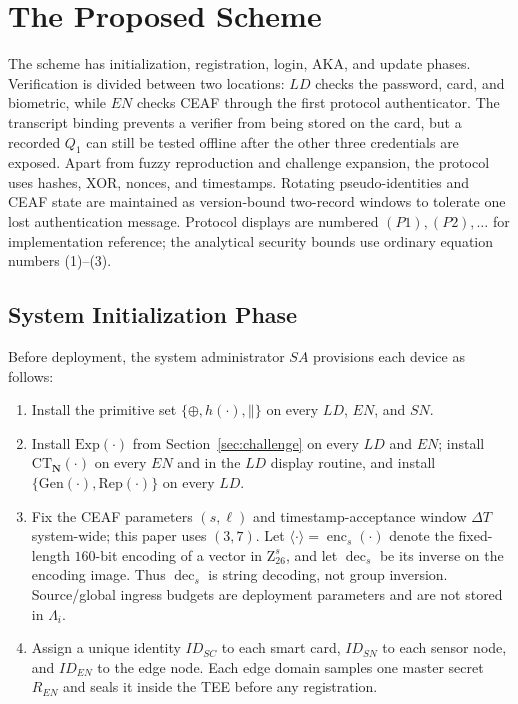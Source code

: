 \documentclass[cmc,article,submit,moreauthors,pdftex]{Definitions/tsp}
\renewcommand{\mathsf}[1]{\mathrm{#1}}
\renewcommand{\mathbb}[1]{\mathrm{#1}}
\newcommand{\cc}{\mathbin{\|}}
\newcommand{\CT}{\mathsf{CT}}
\newcommand{\Gen}{\mathrm{Gen}}
\newcommand{\Rep}{\mathrm{Rep}}
\begin{document}
\section{The Proposed Scheme}\label{sec:scheme}

The scheme has initialization, registration, login, AKA, and update phases. Verification is divided between two locations: $LD$ checks the password, card, and biometric, while $EN$ checks CEAF through the first protocol authenticator. The transcript binding prevents a verifier from being stored on the card, but a recorded $Q_1$ can still be tested offline after the other three credentials are exposed. Apart from fuzzy reproduction and challenge expansion, the protocol uses hashes, XOR, nonces, and timestamps. Rotating pseudo-identities and CEAF state are maintained as version-bound two-record windows to tolerate one lost authentication message. Protocol displays are numbered $(P1),(P2),\ldots$ for implementation reference; the analytical security bounds use ordinary equation numbers (1)--(3).

\subsection{System Initialization Phase}

Before deployment, the system administrator $SA$ provisions each device as follows:

\begin{enumerate}
\item Install the primitive set $\{\oplus, h(\cdot), \cc\}$ on every $LD$, $EN$, and $SN$.
\item Install $\mathsf{Exp}(\cdot)$ from Section~\ref{sec:challenge} on every $LD$ and $EN$; install $\CT_{\mathbf{N}}(\cdot)$ on every $EN$ and in the $LD$ display routine, and install $\{\Gen(\cdot),\Rep(\cdot)\}$ on every $LD$.
\item Fix the CEAF parameters $(s,\ell)$ and timestamp-acceptance window $\Delta T$ system-wide; this paper uses $(3,7)$. Let $\langle\cdot\rangle=\operatorname{enc}_s(\cdot)$ denote the fixed-length $160$-bit encoding of a vector in $\mathbb{Z}_{26}^{s}$, and let $\operatorname{dec}_s$ be its inverse on the encoding image. Thus $\operatorname{dec}_s$ is string decoding, not group inversion. Source/global ingress budgets are deployment parameters and are not stored in $\Lambda_i$.
\item Assign a unique identity $ID_{SC}$ to each smart card, $ID_{SN}$ to each sensor node, and $ID_{EN}$ to the edge node. Each edge domain samples one master secret $R_{EN}$ and seals it inside the TEE before any registration.
\end{enumerate}
\end{document}
